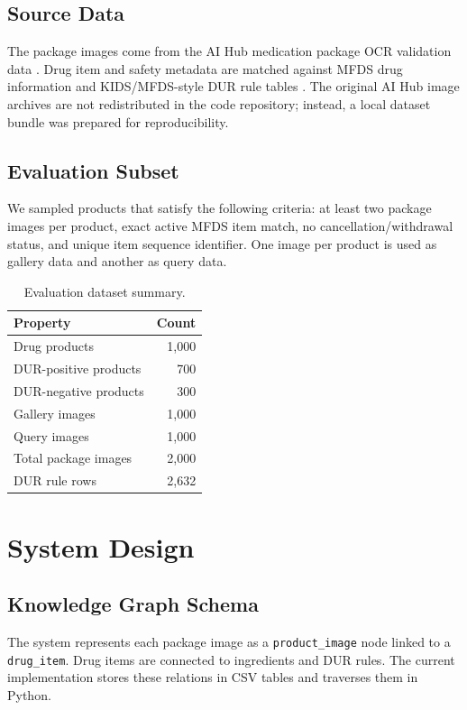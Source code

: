 \documentclass[sigconf,screen,nonacm]{acmart}
\begin{document}
\subsection{Source Data}
The package images come from the AI Hub medication package OCR validation data \cite{aihubmedicine}. Drug item and safety metadata are matched against MFDS drug information and KIDS/MFDS-style DUR rule tables \cite{mfdsdrug,kidsdur}. The original AI Hub image archives are not redistributed in the code repository; instead, a local dataset bundle was prepared for reproducibility.

\subsection{Evaluation Subset}
We sampled products that satisfy the following criteria: at least two package images per product, exact active MFDS item match, no cancellation/withdrawal status, and unique item sequence identifier. One image per product is used as gallery data and another as query data.

\begin{table}[t]
\centering
\caption{Evaluation dataset summary.}
\label{tab:dataset}
\begin{tabular}{lr}
\toprule
Property & Count \\
\midrule
Drug products & 1,000 \\
DUR-positive products & 700 \\
DUR-negative products & 300 \\
Gallery images & 1,000 \\
Query images & 1,000 \\
Total package images & 2,000 \\
DUR rule rows & 2,632 \\
\bottomrule
\end{tabular}
\end{table}

\section{System Design}
\subsection{Knowledge Graph Schema}
The system represents each package image as a \texttt{product\_image} node linked to a \texttt{drug\_item}. Drug items are connected to ingredients and DUR rules. The current implementation stores these relations in CSV tables and traverses them in Python.
\end{document}
